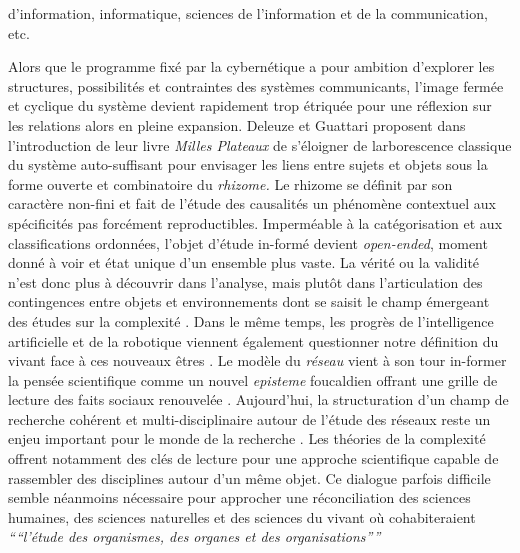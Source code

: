 d{\textquoteright}information, informatique, sciences de l{\textquoteright}information et de la communication, etc.  


Alors que le programme fixé par la cybernétique a pour ambition  d{\textquoteright}explorer les structures, possibilités et  contraintes des systèmes communicants, l{\textquoteright}image  fermée et cyclique du système devient rapidement trop étriquée pour une réflexion sur les relations alors en pleine expansion. Deleuze et  Guattari proposent dans l{\textquoteright}introduction de leur livre  \textit{Milles Plateaux} \citep{Deleuze1972} de s{\textquoteright}éloigner de  l{\textquotesingle}arborescence classique du système auto-suffisant  pour envisager les liens entre sujets et objets sous la forme ouverte  et combinatoire du \textit{rhizome. }Le rhizome se définit par son  caractère non-fini et fait de l{\textquoteright}étude des  causalités un phénomène contextuel aux spécificités pas  forcément reproductibles. Imperméable à la catégorisation et  aux classifications ordonnées, l{\textquoteright}objet  d{\textquoteright}étude in-formé devient \textit{open-ended},  moment donné à voir et état unique d{\textquoteright}un ensemble  plus vaste. La vérité ou la validité n{\textquoteright}est donc  plus à découvrir dans l{\textquoteright}analyse, mais plut\^ot dans  l{\textquoteright}articulation des contingences entre objets et  environnements dont se saisit le champ émergeant des études sur la  complexité \citep{Morin1990}. Dans le m\^eme temps, les progrès de  l{\textquoteright}intelligence artificielle et de la robotique viennent  également questionner notre définition du vivant face à ces  nouveaux \^etres \citep{Hofstadter1999}. Le modèle du \textit{réseau  }vient à son tour in-former la pensée scientifique comme un nouvel  \textit{episteme }foucaldien offrant une grille de lecture des faits  sociaux renouvelée \citep{Castells1989, Latour1996}.  Aujourd{\textquoteright}hui, la structuration d{\textquoteright}un  champ de recherche cohérent et multi-disciplinaire autour de  l{\textquoteright}étude des réseaux reste un enjeu important pour  le monde de la recherche \citep{Brandes2013}. Les théories de la complexité offrent notamment des clés de lecture pour une approche scientifique capable de rassembler des disciplines autour d'un même objet. Ce dialogue parfois difficile semble néanmoins nécessaire pour approcher une réconciliation des sciences humaines, des sciences naturelles et des sciences du vivant o\`u cohabiteraient \textit{``{\textquotedblleft}l{\textquoteright}étude des organismes, des organes et des organisations{\textquotedblright}''} \citep{Morin1990}


